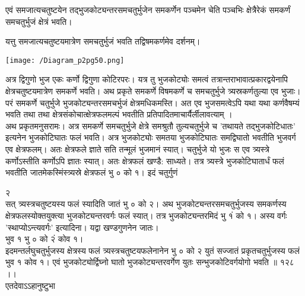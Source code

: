 \documentclass[11pt, openany]{book}
\begin{document}
\begin{sloppypar}
\hangindent=0.2in \hspace{0.2in}एवं समजात्यचतुष्टयेन तद्भुजकोट्यन्तरसमचतुर्भुजेन समकर्णेन पञ्चमेन चेति पञ्चभिः क्षेत्रैरेकं समकर्णं समचतुर्भुजं क्षेत्रं भवति।

\hangindent=0.2in \hspace{0.2in}यत्तु समजात्यचतुष्टयमात्रेण समचतुर्भुजं भवति तद्विषमकर्णमेव दर्शनम्।

\begin{center}
    \texttt{[image: /Diagram\_p2pg50.png]}
\end{center}

\hangindent=0.2in \hspace{0.2in}अत्र द्विगुणो भुज एकः कर्णो द्विगुणा कोटिरपरः। यत्र तु भुजकोट्योः समत्वं तत्रान्तराभावात्प्रकारद्वयेनापि क्षेत्रचतुष्टयमात्रेण समकर्णे भवति। अथ प्रकृते समकर्णे विषमकर्णे च समचतुर्भुजे त्र्यस्रकर्णतुल्या एव भुजाः। परं समकर्णे चतुर्भुजे भुजकोट्यन्तरसमचर्भुजं क्षेत्रमधिकमस्ति। अत एव भुजसमत्वेऽपि यथा यथा कर्णवैषम्यं भवति तथा तथा क्षेत्रसंकोचात्क्षेत्रफलमल्पं भवतीति प्रतिपादितमाचार्यैर्लीलावत्याम् ।\\

\hangindent=0.2in \hspace{0.2in}अथ प्रकृतमनुसरामः। अत्र समकर्णे समचतुर्भुजे क्षेत्रे समश्रुतौ तुल्यचतुर्भुजे च 'तथायते तद्भुजकोटिधातः' इत्यनेन भुजकोटिघातः फलं भवति। अत्र भुजकोट्योः समतया भुजकोटिघातः समद्विघातो भवतीति भुजवर्ग एव क्षेत्रफलम्। अतः क्षेत्रफले ज्ञाते सति तन्मूलं भुजमानं स्यात्। चतुर्भुजे यो भुजः स एव त्र्यस्त्रे कर्णोऽस्तीति कर्णोऽपि ज्ञातः स्यात्। अतः क्षेत्रफलं खण्डै: साध्यते। तत्र त्र्यस्त्रे भुजकोटिघातार्धं फलं भवतीति जातमेकस्मिंस्त्र्यस्रे क्षेत्रफलं भु ० को १। इदं चतुर्गुणं

\hspace{4.75in}२\\

\hangindent=0.2in  सत् त्र्यस्त्रचतुष्टयस्य फलं स्यादिति जातं भु ० को २। अथ भुजकोट्यन्तरसमचतुर्भुजस्य समकर्णस्य क्षेत्रफलस्योक्तयुक्त्या भुजकोट्यन्तरवर्गः फलं स्यात्। तत्र भुजकोट्यन्तरमिदं भु १ं को १। अस्य वर्गः 'स्थाप्योऽन्त्यवर्गः' इत्यादिना। यद्वा खण्डगुणनेन जातः।\\

\hspace{1.5in}भुव १ भु ० को २ं कोव १।\\

\hangindent=0.2in \hspace{0.2in}इदमन्तर्लघुचतुर्भुजस्य क्षेत्रस्य फलं त्र्यस्त्रचतुष्टयफलेनानेन भु ० को २ युतं सज्जातं प्रकृतचतुर्भुजस्य फलं भुव १ कोव १। एवं भुजकोट्योर्द्विघ्नो घातो भुजकोट्यन्तरवर्गेण युतः सन्भुजकोटिवर्गयोगो भवति ॥ १२८ ।।\\

\hangindent=0.2in \hspace{0.2in}एतदेवाऽऽहानुष्टुभा\textendash
\end{sloppypar}
\thispagestyle{empty}
\newpage
\end{document}
